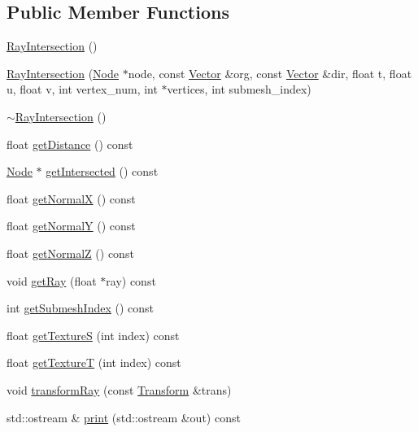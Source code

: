 \subsection*{Public Member Functions}
\begin{CompactItemize}
\item 
\hyperlink{classm3g_1_1RayIntersection_242b33a79f98ed90ad5a36912d2a46d5}{RayIntersection} ()
\item 
\hyperlink{classm3g_1_1RayIntersection_c7d946885706d0cefed30d9ee257a771}{RayIntersection} (\hyperlink{classm3g_1_1Node}{Node} $\ast$node, const \hyperlink{classm3g_1_1Vector}{Vector} \&org, const \hyperlink{classm3g_1_1Vector}{Vector} \&dir, float t, float u, float v, int vertex\_\-num, int $\ast$vertices, int submesh\_\-index)
\item 
\hyperlink{classm3g_1_1RayIntersection_bf9eb45cc9ff31acd542bb0da1b46fe1}{$\sim$RayIntersection} ()
\item 
float \hyperlink{classm3g_1_1RayIntersection_f024301f51d2ef67cac50e3255a49612}{getDistance} () const 
\item 
\hyperlink{classm3g_1_1Node}{Node} $\ast$ \hyperlink{classm3g_1_1RayIntersection_cbf90cea6001c33cc03b5a737b312f62}{getIntersected} () const 
\item 
float \hyperlink{classm3g_1_1RayIntersection_0ee7a8fab5e001b131bd3109da8af7fa}{getNormalX} () const 
\item 
float \hyperlink{classm3g_1_1RayIntersection_1e05e3b3e8d6b46462812e4713a63d18}{getNormalY} () const 
\item 
float \hyperlink{classm3g_1_1RayIntersection_5d0569741397401f53b776f16d08f5c3}{getNormalZ} () const 
\item 
void \hyperlink{classm3g_1_1RayIntersection_3f4d1f2f24c0dadab914014836e1b138}{getRay} (float $\ast$ray) const 
\item 
int \hyperlink{classm3g_1_1RayIntersection_6a11c61d1a1fecc01f2f83463404a6b8}{getSubmeshIndex} () const 
\item 
float \hyperlink{classm3g_1_1RayIntersection_bc14e1d5a83d5fca608b1fbf772614d4}{getTextureS} (int index) const 
\item 
float \hyperlink{classm3g_1_1RayIntersection_843d5b907bb54a6f28571f0a0f14c932}{getTextureT} (int index) const 
\item 
void \hyperlink{classm3g_1_1RayIntersection_ee558b3e4c2a54d66f2bb47e3dea6188}{transformRay} (const \hyperlink{classm3g_1_1Transform}{Transform} \&trans)
\item 
std::ostream \& \hyperlink{classm3g_1_1RayIntersection_6fea17fa1532df3794f8cb39cb4f911f}{print} (std::ostream \&out) const 
\end{CompactItemize}


